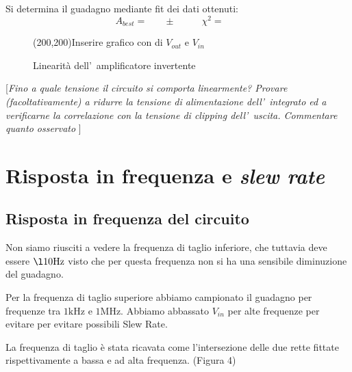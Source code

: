 \documentclass[10pt,a4paper]{article}
\newcommand{\rem}[1]{[\emph{#1}]}
\newcommand{\exn}{\phantom{xxx}}
\begin{document}
	Si determina il guadagno mediante fit dei dati ottenuti:
	\[
	A_{best} = \exn \pm \exn \quad  \chi^2 = \exn
	\]
	\begin{figure}[t]
		\begin{center}
			\framebox(200,200){Inserire grafico con di $V_{out}$ e $V_{in}$}
		\end{center}
		\caption{\small Linearit\`a dell'~amplificatore invertente}
		\label{fig:lin}
	\end{figure}
	
	\rem{Fino a quale tensione il circuito si comporta linearmente? Provare (facoltativamente) a ridurre la 
		tensione di alimentazione dell'~integrato ed a verificarne la correlazione con la tensione di 
		\emph{clipping} dell'~uscita. Commentare quanto osservato }
	
	\section{Risposta in frequenza e \emph{slew rate}}
	\subsection{Risposta in frequenza del circuito}
	Non siamo riusciti a vedere la frequenza di taglio inferiore, che tuttavia deve essere   $\l 10\mathrm{Hz}$ visto che per questa frequenza  non si ha una sensibile diminuzione del guadagno.

 Per la frequenza di taglio superiore abbiamo campionato il guadagno per frequenze tra $1\mathrm{kHz}$ e $ 1\mathrm{MHz}.$
Abbiamo abbassato $V_{in}$ per alte frequenze per evitare per evitare  possibili Slew Rate.

La frequenza di taglio è stata ricavata come l'intersezione delle due rette fittate rispettivamente a bassa e ad alta frequenza.
(Figura 4)
\end{document}
